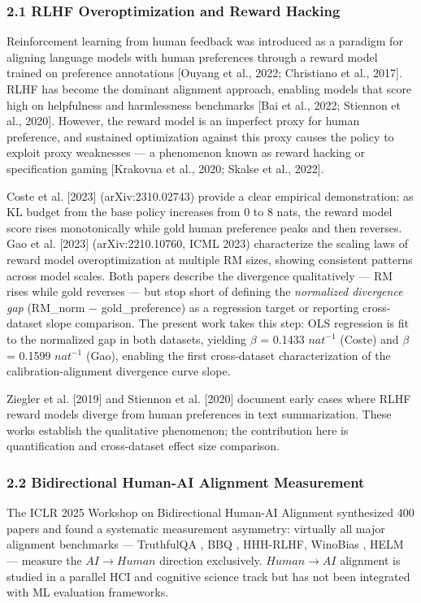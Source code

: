 
\subsubsection{2.1 RLHF Overoptimization and Reward Hacking}

Reinforcement learning from human feedback was introduced as a paradigm for aligning language models with human preferences through a reward model trained on preference annotations [Ouyang et al., 2022; Christiano et al., 2017]. RLHF has become the dominant alignment approach, enabling models that score high on helpfulness and harmlessness benchmarks [Bai et al., 2022; Stiennon et al., 2020]. However, the reward model is an imperfect proxy for human preference, and sustained optimization against this proxy causes the policy to exploit proxy weaknesses --- a phenomenon known as reward hacking or specification gaming [Krakovna et al., 2020; Skalse et al., 2022].

Coste et al. [2023] (arXiv:2310.02743) provide a clear empirical demonstration: as KL budget from the base policy increases from 0 to 8 nats, the reward model score rises monotonically while gold human preference peaks and then reverses. Gao et al. [2023] (arXiv:2210.10760, ICML 2023) characterize the scaling laws of reward model overoptimization at multiple RM sizes, showing consistent patterns across model scales. Both papers describe the divergence qualitatively --- RM rises while gold reverses --- but stop short of defining the \textit{normalized divergence gap} (RM\_norm $-$ gold\_preference) as a regression target or reporting cross-dataset slope comparison. The present work takes this step: OLS regression is fit to the normalized gap in both datasets, yielding $\beta$ = 0.1433 $nat^{-1}$ (Coste) and $\beta$ = 0.1599 $nat^{-1}$ (Gao), enabling the first cross-dataset characterization of the calibration-alignment divergence curve slope.

Ziegler et al. [2019] and Stiennon et al. [2020] document early cases where RLHF reward models diverge from human preferences in text summarization. These works establish the qualitative phenomenon; the contribution here is quantification and cross-dataset effect size comparison.

\subsubsection{2.2 Bidirectional Human-AI Alignment Measurement}

The ICLR 2025 Workshop on Bidirectional Human-AI Alignment synthesized 400 papers and found a systematic measurement asymmetry: virtually all major alignment benchmarks --- TruthfulQA \citep{Lin2022TruthfulQA}, BBQ \citep{Parrish2022BBQ}, HHH-RLHF, WinoBias \citep{Zhao2018Gender}, HELM \citep{Liang2023Holistic} --- measure the $AI\rightarrow Human$ direction exclusively. $Human\rightarrow AI$ alignment is studied in a parallel HCI and cognitive science track but has not been integrated with ML evaluation frameworks.

